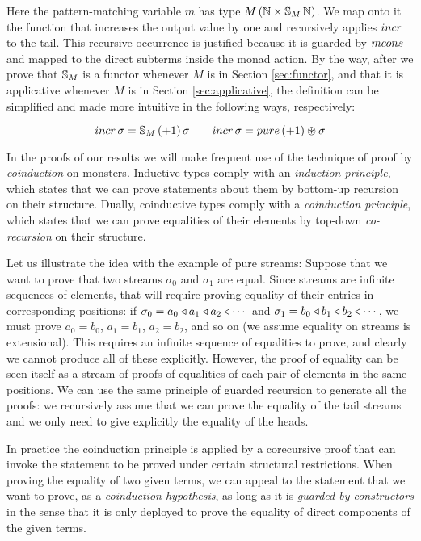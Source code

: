 Here the pattern-matching variable $m$ has type $M\,(\mathbb{N}\times \mathbb{S}_{M}\,\mathbb{N})$.
We map onto it the function that increases the output value by one and recursively applies $\incr$ to the tail.
This recursive occurrence is justified because it is guarded by $\mcons$ and mapped to the direct subterms inside the monad action.
By the way,
after we prove that $\mathbb{S}_{M}$ is a functor whenever $M$ is in Section \ref{sec:functor}, and that it is applicative whenever $M$ is in Section \ref{sec:applicative},
the definition can be simplified and made more intuitive in the following ways, respectively:

$$
\incr\,\sigma = \stream{M}\,(+1)\,\sigma
\qquad
\incr\,\sigma = \apure\,(+1) \appl \sigma
$$

In the proofs of our results we will make frequent use of the technique of proof by {\em coinduction} on monsters.
Inductive types comply with an {\em induction principle}, which states that we can prove statements about them by bottom-up recursion on their structure.
Dually, coinductive types comply with a {\em coinduction principle}, which states that we can prove equalities of their elements by top-down {\em co-recursion} on their structure.

Let us illustrate the idea with the example of pure streams:
Suppose that we want to prove that two streams $\sigma_0$ and $\sigma_1$ are equal.
Since streams are infinite sequences of elements, that will require proving equality of their entries in corresponding positions: if $\sigma_0 = a_0\triangleleft a_1\triangleleft a_2\triangleleft \cdots$ and  $\sigma_1 = b_0\triangleleft b_1\triangleleft b_2\triangleleft \cdots$, we must prove $a_0 = b_0$, $a_1 = b_1$, $a_2=b_2$, and so on (we assume equality on streams is extensional).
This requires an infinite sequence of equalities to prove, and clearly we cannot produce all of these explicitly.
However, the proof of equality can be seen itself as a stream of proofs of equalities of each pair of elements in the same positions.
We can use the same principle of guarded recursion to generate all the proofs: we recursively assume that we can prove the equality of the tail streams and we only need to give explicitly the equality of the heads.

In practice the coinduction principle is applied by a corecursive proof that can invoke the statement to be proved under certain structural restrictions.
When proving the equality of two given terms, we can appeal to the statement that we want to prove, as a {\em coinduction hypothesis}, as long as it is {\em guarded by constructors} in the sense that it is only deployed to prove the equality of direct components of the given terms.

